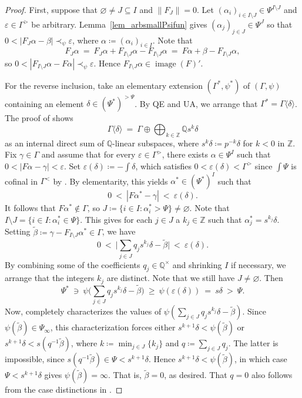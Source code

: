 \documentclass[11pt]{amsart}
\theoremstyle{plain}
\theoremstyle{definition}
\numberwithin{equation}{section}
\newcommand\Q{\mathbb{Q}}
\newcommand\Z{\mathbb{Z}}
\newcommand\0{\varnothing}
\DeclareMathOperator\image{image}
\begin{document}
\begin{proof}
First, suppose that $\0 \neq J \subseteq I$ and $\|F_J\|=0$.
Let $(\alpha_i)_{i\in I\setminus J}\in\Psi^{I\setminus J}$ and $\varepsilon\in\Gamma^>$ be arbitrary.
Lemma~\ref{lem_arbsmallPsifun} gives $(\alpha_j)_{j \in J}\in\Psi^J$ so that $0<|F_J\alpha-\beta|\prec_{\psi}\varepsilon$,
where $\alpha\coloneqq(\alpha_i)_{i \in I}$.
Note that
\[
F_J\alpha \ = \ F_J\alpha+F_{I\setminus J}\alpha-F_{I\setminus J}\alpha \ = \  F\alpha+\beta-F_{I\setminus J}\alpha,
\]
so $0 < |F_{I\setminus J}\alpha-F\alpha| \prec_{\psi} \varepsilon$.
Hence $F_{I\setminus J}\alpha \in \image(F)'$.

For the reverse inclusion, take an elementary extension $(\Gamma^*,\psi^*)$ of $(\Gamma,\psi)$ containing an element $\delta\in(\Psi^*)^{>\Psi}$. By QE and UA, we arrange that $\Gamma^*=\Gamma\langle\delta\rangle$.
The proof of \cite[Lemma~4.11]{GehretACTlog} shows
\[
\Gamma\langle\delta\rangle \ = \ \Gamma\oplus\bigoplus_{k\in\Z}\Q s^k\delta
\]
as an internal direct sum of $\Q$-linear subspaces, where $s^k\delta\coloneqq p^{-k}\delta$ for $k<0$ in $\Z$.
Fix $\gamma\in\Gamma$ and assume that for every $\varepsilon \in \Gamma^>$, there exists $\alpha \in \Psi^I$ such that $0<|F\alpha-\gamma|<\varepsilon$.
Set $\varepsilon(\delta)\coloneqq -\textstyle{\int}\delta$, which satisfies $0<\varepsilon(\delta)<\Gamma^>$ since $\textstyle{\int}\Psi$ is cofinal in $\Gamma^<$ by \cite[Lemma~9.2.15]{ADAMTT}.
By elementarity, this yields $\alpha^*\in (\Psi^*)^I$ such that
\[
0 \ < \ |F\alpha^*-\gamma| \ < \ \varepsilon(\delta).
\]
It follows that $F\alpha^*\not\in\Gamma$, so $J\coloneqq\{i\in I: \alpha^*_i>\Psi\} \neq \0$.
Note that $I \setminus J = \{ i \in I : \alpha^*_i \in \Psi \}$. This gives for each $j\in J$ a $k_j\in\Z$ such that $\alpha_j^*=s^{k_j}\delta$.
Setting $\tilde{\beta}\coloneqq \gamma-F_{I\setminus J}\alpha^* \in \Gamma$,
we have \[
0 \ < \ \big|\sum_{j\in J}q_js^{k_j}\delta-\tilde{\beta}\big| \ < \ \varepsilon(\delta).
\]
By combining some of the coefficients $q_j \in \Q^{\times}$ and shrinking $I$ if necessary, we arrange that the integers $k_j$ are distinct.
Note that we still have $J\neq\0$.
Then
\[
\Psi^* \ \ni \ \psi\big(\sum_{j\in J}q_js^{k_j}\delta-\tilde{\beta}\big) \ \geq \ \psi(\varepsilon(\delta))\ =\ s\delta\ > \ \Psi.
\]
Now, \cite[Theorem 6.6]{GehretACTlog} completely characterizes the values of $\psi(\sum_{j\in J}q_js^{k_j}\delta-\tilde{\beta})$.
Since $\psi(\tilde{\beta})\in\Psi_{\infty}$, this characterization forces either $s^{k+1}\delta<\psi(\tilde{\beta})$ or $s^{k+1}\delta<s(q^{-1}\tilde{\beta})$, where $k\coloneqq\min_{j\in J}\{k_j\}$ and $q\coloneqq\sum_{j\in J}q_j$.
The latter is impossible, since $s(q^{-1}\tilde{\beta})\in\Psi<s^{k+1}\delta$.
Hence $s^{k+1}\delta<\psi(\tilde{\beta})$, in which case $\Psi<s^{k+1}\delta$ gives $\psi(\tilde{\beta})=\infty$.
That is, $\tilde{\beta}=0$, as desired.
That $q=0$ also follows from the case distinctions in \cite[Theorem 6.6]{GehretACTlog}.
\end{proof}
\end{document}
